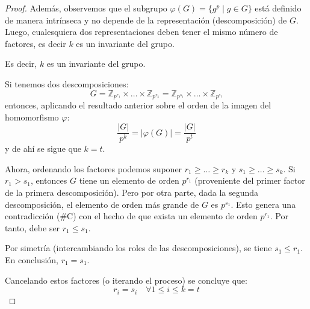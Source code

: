\begin{proof}
Además, observemos que el subgrupo $\varphi(G) = \{g^p \mid g \in G\}$ está definido de manera intrínseca y no depende de la representación (descomposición) de $G$.
Luego, cualesquiera dos representaciones deben tener el mismo número de factores, es decir $k$ es un invariante del grupo.

Es decir, $k$ es un invariante del grupo.

Si tenemos dos descomposiciones:
\begin{equation*}
G = \mathbb{Z}_{p^{r_1}} \times \dots \times \mathbb{Z}_{p^{r_k}} = \mathbb{Z}_{p^{s_1}} \times \dots \times \mathbb{Z}_{p^{s_t}}
\end{equation*}
entonces, aplicando el resultado anterior sobre el orden de la imagen del homomorfismo $\varphi$:
\begin{equation*}
\frac{|G|}{p^k} = |\varphi(G)| = \frac{|G|}{p^t}
\end{equation*}
y de ahí se sigue que $k=t$.

Ahora, ordenando los factores podemos suponer $r_1 \ge \dots \ge r_k$ y $s_1 \ge \dots \ge s_k$.
Si $r_1 > s_1$, entonces $G$ tiene un elemento de orden $p^{r_1}$ (proveniente del primer factor de la primera descomposición).
Pero por otra parte, dada la segunda descomposición, el elemento de orden más grande de $G$ es $p^{s_1}$.
Esto genera una contradicción (\#C) con el hecho de que exista un elemento de orden $p^{r_1}$.
Por tanto, debe ser $r_1 \le s_1$.

Por simetría (intercambiando los roles de las descomposiciones), se tiene $s_1 \le r_1$.
En conclusión, $r_1 = s_1$.

Cancelando estos factores (o iterando el proceso) se concluye que:
\begin{equation*}
r_i = s_i \quad \forall 1 \le i \le k=t
\end{equation*}

\end{proof}


